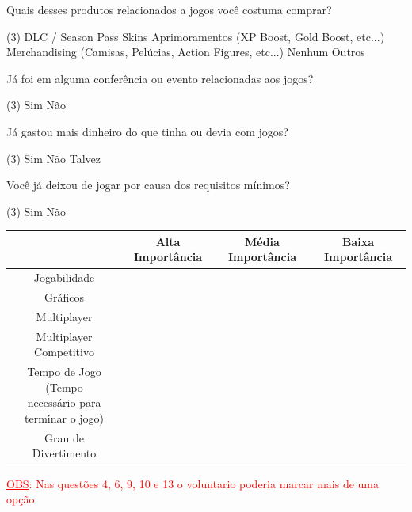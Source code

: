 \documentclass[11pt,a4paper]{article}
\begin{document}
\begin{question}
	Quais desses produtos relacionados a jogos você costuma comprar?
	\begin{tasks}(3)
	\task DLC / Season Pass
	\task Skins
	\task Aprimoramentos (XP Boost, Gold Boost, etc...)
	\task Merchandising (Camisas, Pelúcias, Action Figures, etc...)
	\task Nenhum
	\task Outros
	\end{tasks}
\end{question}
\begin{question}
 Já foi em alguma conferência ou evento relacionadas aos jogos?
	\begin{tasks}(3)
	\task Sim
	\task Não
	\end{tasks}
\end{question}

\begin{question}
	Já gastou mais dinheiro do que tinha ou devia com jogos?
	\begin{tasks}(3)
	\task Sim
	\task Não 
	\task Talvez
	\end{tasks}
\end{question}

\begin{question}
	Você já deixou de jogar por causa dos requisitos mínimos?
	\begin{tasks}(3)
	\task Sim
	\task Não
	\end{tasks}
\end{question}

\begin{question}
\begin{center}
  \begin{tabular}{| c | c | c | c | }
    \hline
    & Alta Importância & Média Importância & Baixa Importância\\ 
    \hline
    \hline
    Jogabilidade & & & \\ \hline
	Gráficos  & & &\\
    \hline
    Multiplayer & & & \\
    \hline
    Multiplayer Competitivo & & & \\
    \hline
    \makecell{	Tempo de Jogo (Tempo \\ necessário para terminar o jogo)}  & & &\\
    \hline
    Grau de Divertimento & & & \\
    \hline
  \end{tabular}
\end{center}
\end{question}
\textcolor{red}{\underline{OBS}: Nas questões 4, 6, 9, 10 e 13 o voluntario poderia marcar mais de uma opção}
\end{document}

